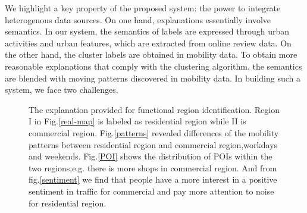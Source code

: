 \documentclass[runningheads]{llncs}
\begin{document}
We highlight a key property of the proposed system: the power to integrate heterogenous data sources. On one hand, explanations essentially involve semantics. In our system, the semantics of labels are expressed through urban activities and urban features, which are extracted from online review data. On the other hand, the cluster labels are obtained in mobility data. To obtain more reasonable explanations that comply with the clustering algorithm, the semantics are blended with moving patterns discovered in mobility data. In building such a system, we face two challenges.

\begin{figure}
\centering
{}
\caption{The explanation provided for functional region identification.
Region I in Fig.\ref{real-map} is labeled as residential region while II is commercial region.
Fig.\ref{patterns} revealed differences of the mobility patterns between residential region and commercial region,workdays and weekends.
Fig.\ref{POI} shows the distribution of POIs within the two regions,e.g. there is more shops in commercial region.
And from fig.\ref{sentiment} we find that people have a more interest in a positive sentiment in traffic for commercial and pay more attention to noise for residential region.}
\label{explanation-example} %
\end{figure}
\end{document}
